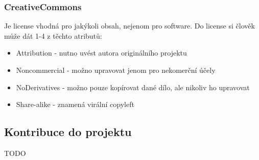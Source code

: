 \subsubsection{CreativeCommons}
Je license vhodná pro jakýkoli obsah, nejenom pro software. Do license si člověk může dát 1-4 z těchto atributů:
\begin{itemize}[itemsep=0px]
\item Attribution - nutno uvést autora originálního projektu
\item Noncommercial - možno upravovat jenom pro nekomerční účely
\item NoDerivatives - možno pouze kopírovat dané dílo, ale nikoliv ho upravovat
\item Share-alike - znamená virální copyleft
\end{itemize}


\subsection{Kontribuce do projektu}
TODO
